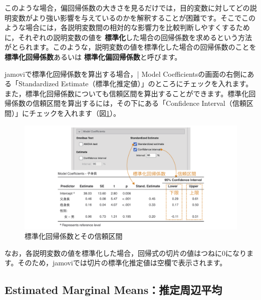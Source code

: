 \documentclass[
  12pt,
  a5jpaper,
  lualatex, ja=standard]{bxjsbook}
\renewcommand{\emph}[1]{\textbf{\color{emph} #1}}
\begin{document}
このような場合，偏回帰係数の大きさを見るだけでは，目的変数に対してどの説明変数がより強い影響を与えているのかを解釈することが困難です。そこでこのような場合には，各説明変数間の相対的な影響力を比較判断しやすくするために，それぞれの説明変数の値を\emph{標準化}した場合の回帰係数を求めるという方法がとられます。このような，説明変数の値を標準化した場合の回帰係数のことを\emph{標準化回帰係数}あるいは\emph{標準化偏回帰係数}と呼びます。

jamoviで標準化回帰係数を算出する場合，\colorbox{bar}{\textcolor{gmoji2}{| Model Coefficients}}の画面の右側にある「Standardized Estimate（標準化推定値）」のところにチェックを入れます。また，標準化回帰係数についても信頼区間を算出することができます。標準化回帰係数の信頼区間を算出するには，その下にある「Confidence Interval（信頼区間）」にチェックを入れます（図\ref{fig:regression-lr-model-coeff-stb}）。

\begin{figure}[!ht]

{\centering \includegraphics[width=1\linewidth]{images/regression/lr-model-coeff-stb} 

}

\caption{標準化回帰係数とその信頼区間}\label{fig:regression-lr-model-coeff-stb}
\end{figure}

なお，各説明変数の値を標準化した場合，回帰式の切片の値はつねに0になります。そのため，jamoviでは切片の標準化推定値は空欄で表示されます。

\hypertarget{sub:regression-LR-marginalmeans}{%
\subsection{Estimated Marginal Means：推定周辺平均}\label{sub:regression-LR-marginalmeans}}
\end{document}
